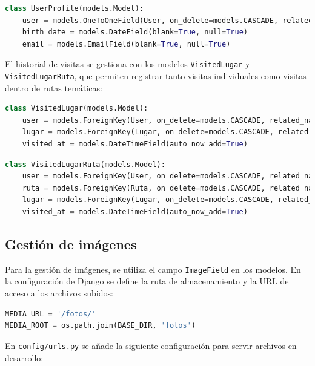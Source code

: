 \begin{lstlisting}[language=Python, caption={Modelo UserProfile}]
class UserProfile(models.Model):
    user = models.OneToOneField(User, on_delete=models.CASCADE, related_name='profile')
    birth_date = models.DateField(blank=True, null=True)
    email = models.EmailField(blank=True, null=True)
\end{lstlisting}

El historial de visitas se gestiona con los modelos \texttt{VisitedLugar} y \texttt{VisitedLugarRuta}, que permiten registrar tanto visitas individuales como visitas dentro de rutas temáticas:

\begin{lstlisting}[language=Python, caption={Modelo VisitedLugar}]
class VisitedLugar(models.Model):
    user = models.ForeignKey(User, on_delete=models.CASCADE, related_name='visited_lugares')
    lugar = models.ForeignKey(Lugar, on_delete=models.CASCADE, related_name='visitas')
    visited_at = models.DateTimeField(auto_now_add=True)
\end{lstlisting}

\begin{lstlisting}[language=Python, caption={Modelo VisitedLugarRuta}]
class VisitedLugarRuta(models.Model):
    user = models.ForeignKey(User, on_delete=models.CASCADE, related_name='visited_lugares_ruta')
    ruta = models.ForeignKey(Ruta, on_delete=models.CASCADE, related_name='visitas')
    lugar = models.ForeignKey(Lugar, on_delete=models.CASCADE, related_name='visitas_ruta')
    visited_at = models.DateTimeField(auto_now_add=True)
\end{lstlisting}

\subsection{Gestión de imágenes}

Para la gestión de imágenes, se utiliza el campo \texttt{ImageField} en los modelos. En la configuración de Django se define la ruta de almacenamiento y la URL de acceso a los archivos subidos:

\begin{lstlisting}[language=Python, caption={Configuración de imágenes en settings.py}]
MEDIA_URL = '/fotos/'
MEDIA_ROOT = os.path.join(BASE_DIR, 'fotos')
\end{lstlisting}

En \texttt{config/urls.py} se añade la siguiente configuración para servir archivos en desarrollo:

